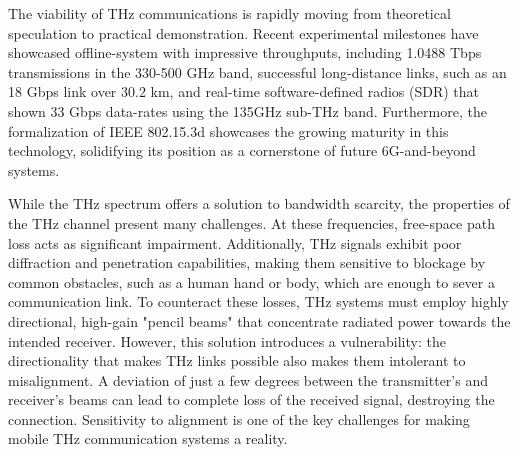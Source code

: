 \documentclass[fleqn,10pt]{wlscirep}
\begin{document}
The viability of THz communications is rapidly moving from theoretical speculation to practical demonstration\cite{Jornet2023}. Recent experimental milestones have showcased offline-system with impressive throughputs, including 1.0488 Tbps transmissions in the 330-500 GHz band, successful long-distance links, such as an 18 Gbps link over 30.2 km\cite{Yu2025Research}, and real-time software-defined radios (SDR) that shown 33 Gbps data-rates using the 135GHz sub-THz band\cite{9536953,10704668}. Furthermore, the formalization of IEEE 802.15.3d showcases the growing maturity in this technology, solidifying its position as a cornerstone of future 6G-and-beyond systems\cite{9269931,10494372}.

While the THz spectrum offers a solution to bandwidth scarcity, the properties of the THz channel present many challenges. At these frequencies, free-space path loss acts as significant impairment\cite{10422992, Yu2025Research, Kleine-Ostmann2011}. Additionally, THz signals exhibit poor diffraction and penetration capabilities, making them sensitive to blockage by common obstacles, such as a human hand or body, which are enough to sever a communication link\cite{10494372, Jornet2023}. To counteract these losses, THz systems must employ highly directional, high-gain "pencil beams" that concentrate radiated power towards the intended receiver\cite{Kleine-Ostmann2011}. However, this solution introduces a vulnerability: the directionality that makes THz links possible also makes them intolerant to misalignment. A deviation of just a few degrees between the transmitter's and receiver's beams can lead to complete loss of the received signal, destroying the connection. Sensitivity to alignment is one of the key challenges for making mobile THz communication systems a reality\cite{10036372, Petrov2023Mobile, Azari2022}.
\end{document}
